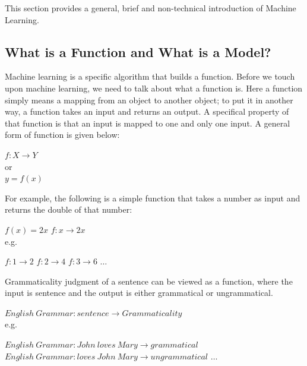 \documentclass[final]{ua-thesis}
\numberwithin{equation}{section}
\begin{document}
This section provides a general, brief and non-technical introduction of Machine Learning.

\subsection{What is a Function and What is a Model?}
Machine learning is a specific algorithm that builds a function. Before we touch upon machine learning, we need to talk about what a function is. Here a function simply means a mapping from an object to another object; to put it in another way, a function takes an input and returns an output. A specifical property of that function is that an input is mapped to one and only one input. A general form of function is given below:

\begin{exe}
\ex $f: X \rightarrow Y$\\
	or \\
	$ y=f(x) $
\end{exe} 


For example, the following is a simple function that takes a number as input and returns the double of that number:

\begin{exe}
\ex \label{math_function}
\begin{xlist}
\ex $f(x)=2x$
\ex $f: x \rightarrow 2x $\\
	e.g.
	\begin{xlist}
	\ex $f: 1 \rightarrow 2$
	\ex $f: 2 \rightarrow 4$
	\ex $f: 3 \rightarrow 6$
	\ex $\dots$
	\end{xlist}
\end{xlist}
\end{exe}

Grammaticality judgment of a sentence can be viewed as a function, where the input is sentence and the output is either grammatical or ungrammatical.  

\begin{exe}
\ex 
\begin{xlist}
\ex $English\ Grammar: sentence \rightarrow Grammaticality$\\
	e.g.
	\begin{xlist}
	\ex $English\ Grammar:  John\ loves\ Mary \rightarrow grammatical $
	\ex $English\ Grammar: loves\ John\ Mary \rightarrow ungrammatical $
	\ex $\dots$
	\end{xlist}
\end{xlist}
\end{exe}
\end{document}
